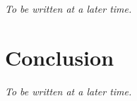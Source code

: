 \documentclass[
10pt, %
a4paper, %
oneside, %
headinclude,footinclude, %
] {book}%
\begin{document}
\textit{To be written at a later time.}


\chapter{Conclusion}

\textit{To be written at a later time.}



 

\end{document}
